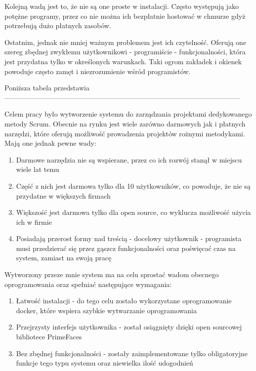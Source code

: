 Kolejną wadą jest to, że nie są one proste w instalacji. Często występują jako potężne programy, przez co nie można ich bezpłatnie hostować w chmurze gdyż potrzebują dużo płatnych zasobów. 

Ostatnim, jednak nie mniej ważnym problemem jest ich czytelność. Oferują one szereg zbędnej zwykłemu użytkownikowi - programiście - funkcjonalności, która jest przydatna tylko w określonych warunkach. Taki ogrom zakładek i okienek powoduje często zamęt i niezrozumienie wśród programistów.


Poniższa tabela przedstawia 
------------------------------------------------------------------------------------------------------

Celem pracy było wytworzenie systemu do zarządzania projektami dedykowanego metody Scrum. Obecnie na rynku jest wiele zarówno darmowych jak i płatnych narzędzi, które oferują możliwość prowadzenia projektów rożnymi metodykami. Mają one jednak pewne wady:
\begin{enumerate}
	\item Darmowe narzędzia nie są wspierane, przez co ich rozwój stanął w miejscu wiele lat temu
	\item Część z nich jest darmowa tylko dla 10 użytkowników, co powoduje, że nie są przydatne w większych firmach
	\item Większość jest darmowa tylko dla open source, co wyklucza możliwość użycia ich w firmie
	\item Posiadają przerost formy nad treścią - docelowy użytkownik - programista musi przedzierać się przez gąszcz funkcjonalności oraz poświęcać czas na system, zamiast na swoją pracę
\end{enumerate}

Wytworzony przeze mnie system ma na celu sprostać wadom obecnego oprogramowania oraz spełniać następujące wymagania:
\begin{enumerate}
	\item Łatwość instalacji - do tego celu zostało wykorzystane oprogramowanie docker, które wspiera szybkie wytwarzanie oprogramowania
	\item Przejrzysty interfejs użytkownika - został osiągnięty dzięki open sourcowej bibliotece PrimeFaces
	\item Bez zbędnej funkcjonalności - zostały zaimplementowane tylko obligatoryjne funkcje tego typu systemu oraz niewielka ilość udogodnień
\end{enumerate}

